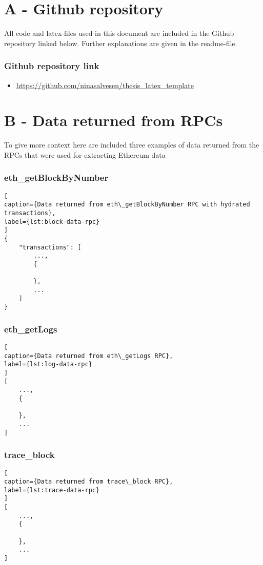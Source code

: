 

\chapter*{A - Github repository}

All code and latex-files used in this document are included in the Github repository linked below. Further explanations are given in the readme-file. 


\subsection*{Github repository link}
\begin{itemize}
    \item \url{https://github.com/ninasalvesen/thesis_latex_template}
\end{itemize}

\chapter*{B - Data returned from RPCs}

To give more context here are included three examples of data returned from the RPCs that were used for extracting Ethereum data 


\subsection*{eth\_getBlockByNumber}

\begin{lstlisting}[
caption={Data returned from eth\_getBlockByNumber RPC with hydrated transactions},
label={lst:block-data-rpc}
]
{
    "transactions": [
        ...,
        {
        
        },
        ...
    ]
}
\end{lstlisting}

\subsection*{eth\_getLogs}

\begin{lstlisting}[
caption={Data returned from eth\_getLogs RPC},
label={lst:log-data-rpc}
]
[
    ...,
    {
    
    },
    ...
]
\end{lstlisting}

\subsection*{trace\_block}

\begin{lstlisting}[
caption={Data returned from trace\_block RPC},
label={lst:trace-data-rpc}
]
[
    ...,
    {
    
    },
    ...
]
\end{lstlisting}